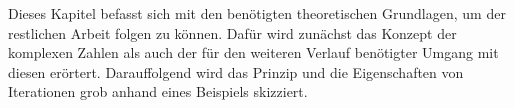 
Dieses Kapitel befasst sich mit den ben\"otigten theoretischen Grundlagen, um
der restlichen Arbeit folgen zu k\"onnen.
Daf\"ur wird zun\"achst das Konzept der komplexen Zahlen als auch der f\"ur den weiteren
Verlauf ben\"otigter Umgang mit diesen er\"ortert.
Darauffolgend wird das Prinzip und die Eigenschaften von Iterationen grob
anhand eines Beispiels skizziert.


